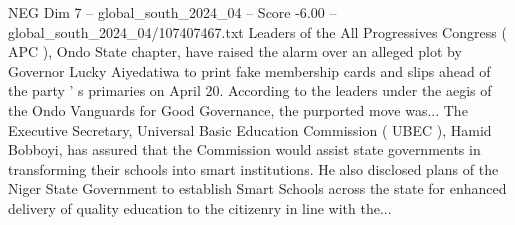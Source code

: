 \begin{textsample}{NEG Dim 7 – global\_south\_2024\_04 – Score -6.00 – global\_south\_2024\_04/107407467.txt}
Leaders of the All Progressives Congress ( APC ), Ondo State chapter, have raised the alarm over an alleged plot by Governor Lucky Aiyedatiwa to print fake membership cards and slips ahead of the party ' s primaries on April 20.
According to the leaders under the aegis of the Ondo Vanguards for Good Governance, the purported move was...
The Executive Secretary, Universal Basic Education Commission ( UBEC ), Hamid Bobboyi, has assured that the Commission would assist state governments in transforming their schools into smart institutions.
He also disclosed plans of the Niger State Government to establish Smart Schools across the state for enhanced delivery of quality education to the citizenry in line with the...

\end{textsample}
